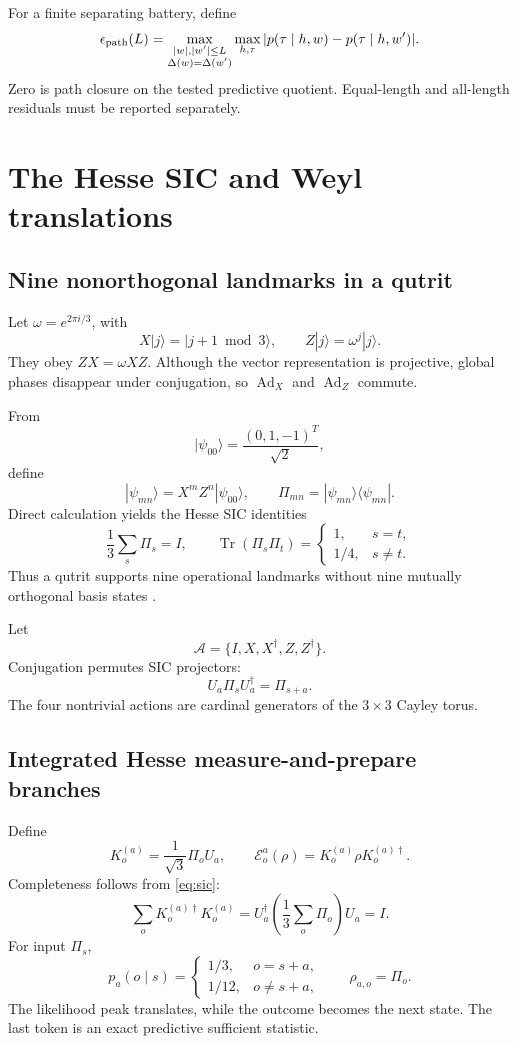 \documentclass[11pt]{article}
\theoremstyle{definition}
\theoremstyle{remark}
\newcommand{\cE}{\mathcal E}
\newcommand{\cA}{\mathcal A}
\newcommand{\Tr}{\operatorname{Tr}}
\begin{document}
For a finite separating battery, define
\[
\epsilon_{\rm path}(L)=
\max_{\substack{|w|,|w'|\le L\\\Delta(w)=\Delta(w')}}
\max_{h,\tau}|p(\tau\mid h,w)-p(\tau\mid h,w')|.
\]
Zero is path closure on the tested predictive quotient. Equal-length and
all-length residuals must be reported separately.

\section{The Hesse SIC and Weyl translations}
\label{sec:hesse}

\subsection{Nine nonorthogonal landmarks in a qutrit}

Let \(\omega=e^{2\pi i/3}\), with
\[
X|j\rangle=|j+1\bmod3\rangle,\qquad
Z|j\rangle=\omega^j|j\rangle.
\]
They obey \(ZX=\omega XZ\). Although the vector representation is projective,
global phases disappear under conjugation, so
\(\operatorname{Ad}_X\) and \(\operatorname{Ad}_Z\) commute.

From
\[
|\psi_{00}\rangle=\frac{(0,1,-1)^T}{\sqrt2},
\]
define
\[
|\psi_{mn}\rangle=X^mZ^n|\psi_{00}\rangle,\qquad
\Pi_{mn}=|\psi_{mn}\rangle\langle\psi_{mn}|.
\]
Direct calculation yields the Hesse SIC identities
\begin{equation}
\frac13\sum_s\Pi_s=I,\qquad
\Tr(\Pi_s\Pi_t)=
\begin{cases}
1,&s=t,\\
1/4,&s\ne t.
\end{cases}
\label{eq:sic}
\end{equation}
Thus a qutrit supports nine operational landmarks without nine mutually
orthogonal basis states \cite{Renes2004}.

Let
\[
\cA=\{I,X,X^\dagger,Z,Z^\dagger\}.
\]
Conjugation permutes SIC projectors:
\[
U_a\Pi_sU_a^\dagger=\Pi_{s+a}.
\]
The four nontrivial actions are cardinal generators of the
\(3\times3\) Cayley torus.

\subsection{Integrated Hesse measure-and-prepare branches}

Define
\begin{equation}
K_o^{(a)}=\frac1{\sqrt3}\Pi_oU_a,\qquad
\cE_o^a(\rho)=K_o^{(a)}\rho K_o^{(a)\dagger}.
\label{eq:hesse-inst}
\end{equation}
Completeness follows from \cref{eq:sic}:
\[
\sum_oK_o^{(a)\dagger}K_o^{(a)}=
U_a^\dagger\left(\frac13\sum_o\Pi_o\right)U_a=I.
\]
For input \(\Pi_s\),
\begin{equation}
p_a(o\mid s)=
\begin{cases}
1/3,&o=s+a,\\
1/12,&o\ne s+a,
\end{cases}
\qquad \rho_{a,o}=\Pi_o.
\label{eq:hesse-law}
\end{equation}
The likelihood peak translates, while the outcome becomes the next state.
The last token is an exact predictive sufficient statistic.
\end{document}
